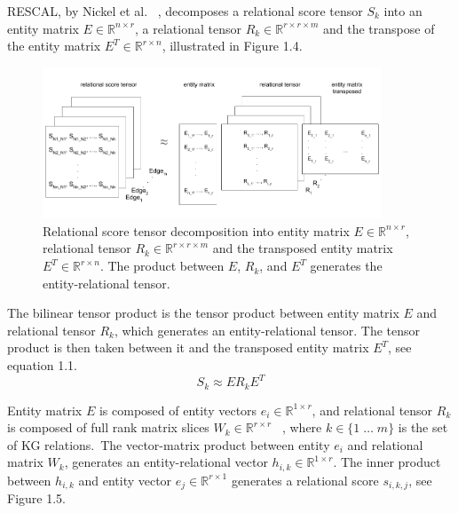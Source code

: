 \noindent RESCAL, by Nickel et al. \unskip~\citep{nickel2011three}, decomposes a relational score tensor $ S_k $ into an entity matrix $ E  \in \mathbb{R}^{n \times r} $, a relational tensor $ R_k \in \mathbb{R}^{r \times r \times m}$ and the transpose of the entity matrix $ E^T \in \mathbb{R}^{r \times n} $, illustrated in Figure 1.4. \par

\begin{figure}[H]
   	\centering
    	\includegraphics[width=0.9\textwidth, height=0.4\textwidth]{relational_tensor_entity_relational_factorisation}
	\captionsetup{justification=centering}
	\caption{Relational score tensor decomposition into entity matrix $ E  \in \mathbb{R}^{n \times r} $, relational tensor $ R_k \in \mathbb{R}^{r \times r \times m} $ and the transposed entity matrix $ E^T \in \mathbb{R}^{r \times n} $. The product between $ E $, $ R_k $, and $ E^T $ generates the entity-relational tensor.}
\end{figure}

\noindent The bilinear tensor product is the tensor product between entity matrix $ E $ and relational tensor $ R_k $, which generates an entity-relational tensor. The tensor product is then taken between it and the transposed entity matrix $ E^T $, see equation 1.1.
\begin{equation}
	S_k \approx ER_kE^T
\end{equation}

\noindent Entity matrix $ E $ is composed of entity vectors $ e_i \in \mathbb{R}^{1 \times r} $, and relational tensor $ R_k $ is composed of full rank matrix slices $ W_k \in \mathbb{R}^{r \times r} $ \unskip~\citep{nickel2012factorizing}, where $ k \in \{1 \; \dots \; m \} $ is the set of KG relations.\ The vector-matrix product between entity $ e_i $ and relational matrix $ W_k $, generates an entity-relational vector $ h_{i,k} \in \mathbb{R}^{1 \times r} $. The inner product between $ h_{i,k} $ and entity vector $ e_j \in \mathbb{R}^{r \times 1} $ generates a relational score $ s_{i,k,j} $, see Figure 1.5. 

